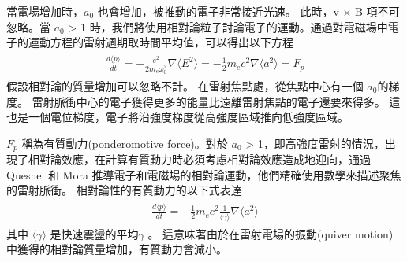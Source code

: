 當電場增加時，\(a_{0}\) 也會增加，被推動的電子非常接近光速。 此時，v × B 項不可忽略。當 \(a_{0}\) > 1 \cite{GG2011} 時，我們將使用相對論粒子討論電子的運動。通過對電磁場中電子的運動方程的雷射週期取時間平均值，可以得出以下方程
\begin{align}
  \begin{split}
    \frac{d\langle p\rangle}{dt} = -\frac{e^{2}}{2m_e\omega_0^{2}}\nabla \langle E^{2} \rangle = -\frac{1}{2}m_ec^{2}\nabla \langle a^{2}\rangle = F_{p}
  \end{split}
\end{align}
假設相對論的質量增加可以忽略不計。 在雷射焦點處，從焦點中心有一個 \(a_{0}\)的梯度。 雷射脈衝中心的電子獲得更多的能量比遠離雷射焦點的電子還要來得多。 這也是一個電位梯度，電子將沿強度梯度從高強度區域推向低強度區域。


\(F_p\) 稱為有質動力(ponderomotive force)。對於 \(a_0\) > 1，即高強度雷射的情況，出現了相對論效應，在計算有質動力時必須考慮相對論效應造成地迎向，通過 Quesnel 和 Mora 推導電子和電磁場的相對論運動，他們精確使用數學來描述聚焦的雷射脈衝。\cite{PhysRevE.58.3719} 相對論性的有質動力的以下式表達
\begin{align}
  \begin{split}
    \frac{d\langle p\rangle}{dt} = -\frac{1}{2}m_ec^{2}\frac{1}{\langle\gamma\rangle}\nabla \langle a^{2}\rangle
  \end{split}
\end{align}
其中 \(\langle\gamma\rangle\) 是快速震盪的平均\(\gamma\) 。 這意味著由於在雷射電場的振動(quiver motion)中獲得的相對論質量增加，有質動力會減小。
